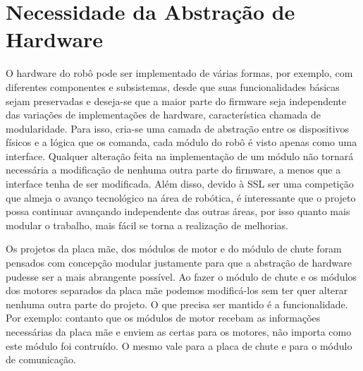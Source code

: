 \chapter{Necessidade da Abstração de Hardware}\label{cap:necessidade_abstr_hw}

O hardware do robô pode ser implementado de várias formas, por exemplo, com diferentes componentes e subsistemas, desde que suas funcionalidades básicas sejam preservadas e deseja-se que a maior parte do firmware seja independente das variações de implementações de hardware, característica chamada de modularidade. Para isso, cria-se uma camada de abstração entre os dispositivos físicos e a lógica que os comanda, cada módulo do robô é visto apenas como uma interface. Qualquer alteração feita na implementação de um módulo não tornará necessária a modificação de nenhuma outra parte do firmware, a menos que a interface tenha de ser modificada. Além disso, devido à SSL ser uma competição que almeja o avanço tecnológico na área de robótica, é interessante que o projeto possa continuar avançando independente das outras áreas, por isso quanto mais modular o trabalho, mais fácil se torna a realização de melhorias.

Os projetos da placa mãe, dos módulos de motor e do módulo de chute foram pensados com concepção modular justamente para que a abstração de hardware pudesse ser a mais abrangente possível. Ao fazer o módulo de chute e os módulos dos motores separados da placa mãe podemos modificá-los sem ter quer alterar nenhuma outra parte do projeto. O que precisa ser mantido é a funcionalidade. Por exemplo: contanto que os módulos de motor recebam as informações necessárias da placa mãe e enviem as certas para os motores, não importa como este módulo foi contruído. O mesmo vale para a placa de chute e para o módulo de comunicação.

